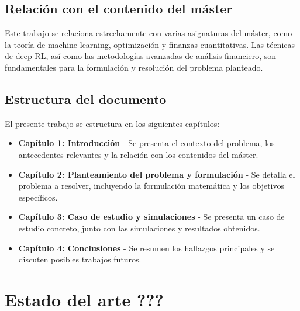\documentclass[a4paper,12pt]{report}
\begin{document}


\section{Relación con el contenido del máster}

Este trabajo se relaciona estrechamente con varias asignaturas del máster, como la teoría de machine learning, optimización y finanzas 
cuantitativas. Las técnicas de deep RL, así como las metodologías avanzadas de análisis financiero, son fundamentales para la formulación 
y resolución del problema planteado.

\section{Estructura del documento}

El presente trabajo se estructura en los siguientes capítulos:

\begin{itemize}
    \item \textbf{Capítulo 1: Introducción} - Se presenta el contexto del problema, los antecedentes relevantes y la relación con los 
    contenidos del máster.
    \item \textbf{Capítulo 2: Planteamiento del problema y formulación} - Se detalla el problema a resolver, incluyendo la formulación 
    matemática y los objetivos específicos.
    \item \textbf{Capítulo 3: Caso de estudio y simulaciones} - Se presenta un caso de estudio concreto, junto con las simulaciones y 
    resultados obtenidos.
    \item \textbf{Capítulo 4: Conclusiones} - Se resumen los hallazgos principales y se discuten posibles trabajos futuros.
\end{itemize}

\chapter{Estado del arte ???}
\end{document}
